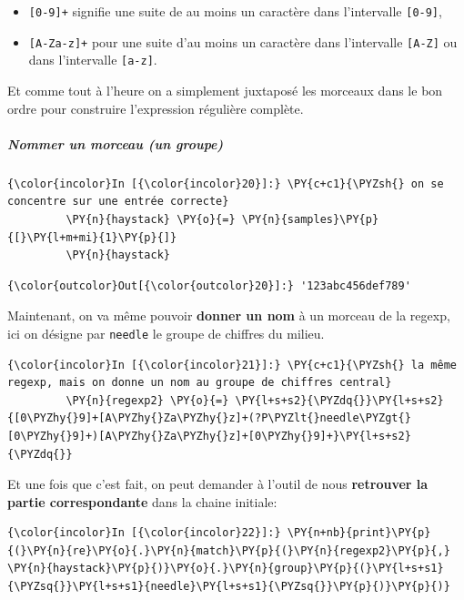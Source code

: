 \begin{itemize}
	\item 
	\texttt{{[}0-9{]}+} signifie une suite
	de au moins un caractère dans l'intervalle \texttt{{[}0-9{]}},
	\item
	\texttt{{[}A-Za-z{]}+} pour une suite d'au moins un caractère dans
	l'intervalle \texttt{{[}A-Z{]}} ou dans l'intervalle \texttt{{[}a-z{]}}.
\end{itemize}

Et comme tout à l'heure on a simplement juxtaposé les morceaux dans le
bon ordre pour construire l'expression régulière complète.

    \hypertarget{nommer-un-morceau-un-groupe}{%
\subparagraph{Nommer un morceau (un
groupe)}\label{nommer-un-morceau-un-groupe}}

    \begin{Verbatim}[commandchars=\\\{\}]
{\color{incolor}In [{\color{incolor}20}]:} \PY{c+c1}{\PYZsh{} on se concentre sur une entrée correcte}
         \PY{n}{haystack} \PY{o}{=} \PY{n}{samples}\PY{p}{[}\PY{l+m+mi}{1}\PY{p}{]}
         \PY{n}{haystack}
\end{Verbatim}


\begin{Verbatim}[commandchars=\\\{\}]
{\color{outcolor}Out[{\color{outcolor}20}]:} '123abc456def789'
\end{Verbatim}
            
    Maintenant, on va même pouvoir \textbf{donner un nom} à un morceau de la
regexp, ici on désigne par \texttt{needle} le groupe de chiffres du
milieu.

    \begin{Verbatim}[commandchars=\\\{\}]
{\color{incolor}In [{\color{incolor}21}]:} \PY{c+c1}{\PYZsh{} la même regexp, mais on donne un nom au groupe de chiffres central}
         \PY{n}{regexp2} \PY{o}{=} \PY{l+s+s2}{\PYZdq{}}\PY{l+s+s2}{[0\PYZhy{}9]+[A\PYZhy{}Za\PYZhy{}z]+(?P\PYZlt{}needle\PYZgt{}[0\PYZhy{}9]+)[A\PYZhy{}Za\PYZhy{}z]+[0\PYZhy{}9]+}\PY{l+s+s2}{\PYZdq{}}
\end{Verbatim}


    Et une fois que c'est fait, on peut demander à l'outil de nous
\textbf{retrouver la partie correspondante} dans la chaine initiale:

    \begin{Verbatim}[commandchars=\\\{\}]
{\color{incolor}In [{\color{incolor}22}]:} \PY{n+nb}{print}\PY{p}{(}\PY{n}{re}\PY{o}{.}\PY{n}{match}\PY{p}{(}\PY{n}{regexp2}\PY{p}{,} \PY{n}{haystack}\PY{p}{)}\PY{o}{.}\PY{n}{group}\PY{p}{(}\PY{l+s+s1}{\PYZsq{}}\PY{l+s+s1}{needle}\PY{l+s+s1}{\PYZsq{}}\PY{p}{)}\PY{p}{)}
\end{Verbatim}


